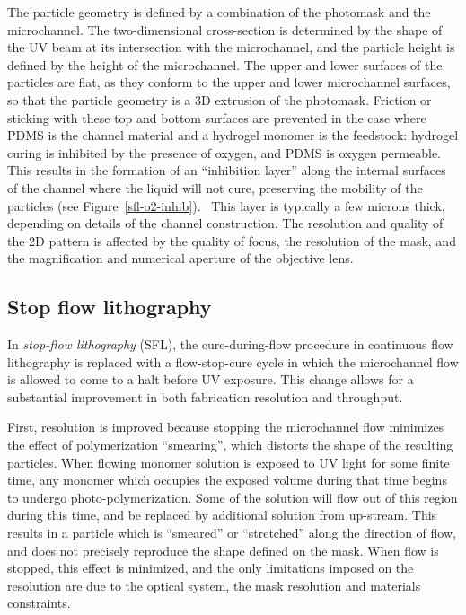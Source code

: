 The particle geometry is defined by a combination of the photomask and the microchannel.  The two-dimensional cross-section
is determined by the shape of the UV beam at its intersection with the microchannel, and the particle height is defined by
the height of the microchannel. The upper and lower surfaces of the particles
are flat, as they conform to the upper and lower microchannel surfaces, so that the particle geometry
is a 3D extrusion of the photomask.
Friction or sticking with these top and bottom
surfaces are prevented in the case where PDMS is the channel material and a hydrogel monomer is the feedstock: hydrogel
curing is inhibited by the presence of oxygen, and PDMS is oxygen permeable. This results in the formation of an 
``inhibition layer'' along the internal surfaces of the channel where the liquid will not cure, preserving the mobility 
of the particles (see Figure~\ref{sfl-o2-inhib}).~\cite{dendukuri-oxygen}
This layer is typically a few microns thick, depending on 
details of the channel construction.
The resolution and quality of the 2D pattern 
is affected by the quality of focus, the resolution of the mask,
and the magnification and numerical aperture of the objective lens.  

\subsection{Stop flow lithography}
\label{sec:SFL}

In \textit{stop-flow lithography} (SFL), the cure-during-flow
procedure in continuous flow lithography is replaced with a flow-stop-cure cycle in which the microchannel flow
is allowed to come to a halt before UV exposure. This change allows for a substantial improvement in both 
fabrication resolution and throughput.~\cite{dendukuri-sfl}

First, resolution is improved because stopping the microchannel flow minimizes the effect of polymerization
``smearing'', which distorts the shape of the resulting particles.
When flowing monomer solution is exposed to UV light for some finite time, any monomer which occupies the exposed volume 
during that time begins to undergo photo-polymerization.  Some of the solution will flow out of this region 
during this time, and be replaced by additional solution from up-stream. This results in a particle which is ``smeared''
or ``stretched'' along the direction of flow, and does not precisely reproduce the shape defined on the mask.  
When flow is 
stopped, this effect is minimized, and the only limitations imposed on the resolution are due to the optical system,
the mask resolution and materials constraints.

